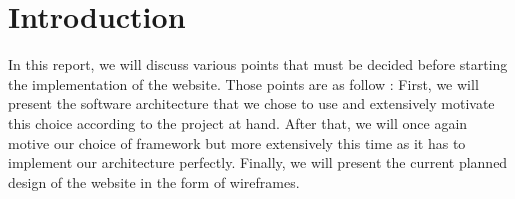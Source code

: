 
\section{Introduction}


In this report, we will discuss various points that must be decided before starting the implementation of the website. Those points are as follow : First, we will present the software architecture that we chose to use and extensively motivate this choice according to the project at hand. After that, we will once again motive our choice of framework but more extensively this time as it has to implement our architecture perfectly. Finally, we will present the current planned design of the website in the form of wireframes.
